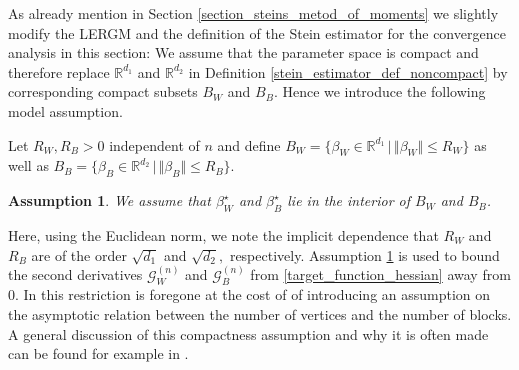 \documentclass{article}
\newtheorem{Assumption}[Theorem]{Assumption}
\begin{document}
As already mention in Section \ref{section_steins_metod_of_moments} we slightly modify the LERGM and the definition of the Stein estimator for the convergence analysis in this section: We assume that the parameter space is compact and therefore replace $\mathbb{R}^{d_1}$ and $\mathbb{R}^{d_2}$ in Definition \ref{stein_estimator_def_noncompact} by corresponding compact subsets $B_W$ and $B_B$. Hence we introduce the following model assumption. \par

Let $R_W, R_B > 0$ independent of $n$ and define $B_W = \{\beta_W \in \mathbb{R}^{d_1} \, \vert \, \Vert \beta_W \Vert \leq R_W \}$ as well as $B_B = \{\beta_B \in \mathbb{R}^{d_2} \, \vert \, \Vert \beta_B \Vert \leq R_B \}$. 


\begin{Assumption} \label{ass_compact_par}
    We assume that $\beta_W^{\star}$ and $\beta_B^{\star}$ lie in the interior of $B_W$ and $B_B$. 
\end{Assumption}

Here, using the Euclidean norm, we note the implicit dependence that $R_W$ and $R_B$ are of the order $\sqrt{d_1}$ and $\sqrt{d_2},$ respectively. Assumption \ref{ass_compact_par} is used to bound the second derivatives $\mathcal{G}_W^{(n)}$ and $\mathcal{G}_B^{(n)}$ from \eqref{target_function_hessian} away from $0$. In \cite{stewart2026rates}  this restriction is foregone at the cost of of introducing an assumption on the asymptotic relation between the number of vertices and the number of blocks. A general discussion of this compactness assumption and why it is often made can be found for example in \cite{newey1994large}. \par
\end{document}
